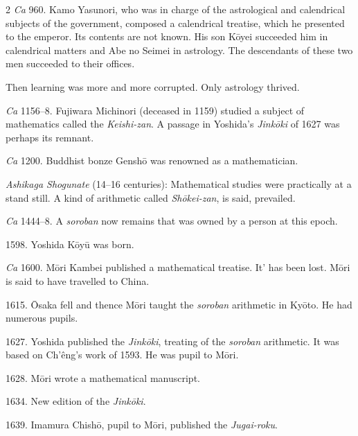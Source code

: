 \documentclass[11pt]{article}
\newcommand{\scanfooter}{}
\begin{document}
\begin{multicols}{2}
\emph{Ca} 960. Kamo Yasunori, who was in charge of the astrological and calendrical subjects of the government, composed a calendrical treatise, which he presented to the emperor. Its contents are not known. His son Kōyei succeeded him in calendrical matters and Abe no Seimei in astrology. The descendants of these two men succeeded to their offices.

Then learning was more and more corrupted. Only astrology thrived.

\emph{Ca} 1156--8. Fujiwara Michinori (deceased in 1159) studied a subject of mathematics called the \emph{Keishi-zan}. A passage in Yoshida's \emph{Jinkōki} of 1627 was perhaps its remnant.

\emph{Ca} 1200. Buddhist bonze Genshō was renowned as a mathematician.

\emph{Ashikaga Shogunate} (14--16 centuries): Mathematical studies were practically at a stand still. A kind of arithmetic called \emph{Shōkei-zan}, is said, prevailed.

\emph{Ca} 1444--8. A \emph{soroban} now remains that was owned by a person at this epoch.

1598. Yoshida Kōyū was born.

\emph{Ca} 1600. Mōri Kambei published a mathematical treatise. It' has been lost. Mōri is said to have travelled to China.

1615. Ōsaka fell and thence Mōri taught the \emph{soroban} arithmetic in Kyōto. He had numerous pupils.

1627. Yoshida published the \emph{Jinkōki}, treating of the \emph{soroban} arithmetic. It was based on Ch'êng's work of 1593. He was pupil to Mōri.

1628. Mōri wrote a mathematical manuscript.

1634. New edition of the \emph{Jinkōki}.

1639. Imamura Chishō, pupil to Mōri, published the \emph{Jugai-roku}.
\end{multicols}
\scanfooter
\end{document}

